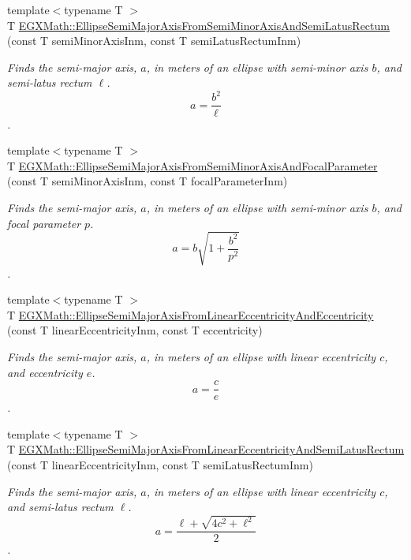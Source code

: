\begin{DoxyCompactItemize}
{\footnotesize template$<$typename T $>$ }\\T \mbox{\hyperlink{group___e_g_x_math-_geometry-2_d-_ellipse-_semi_major_axis_ga1352fb9ee77a05d6b5d733c0fa048479}{E\+G\+X\+Math\+::\+Ellipse\+Semi\+Major\+Axis\+From\+Semi\+Minor\+Axis\+And\+Semi\+Latus\+Rectum}} (const T semi\+Minor\+Axis\+Inm, const T semi\+Latus\+Rectum\+Inm)
\begin{DoxyCompactList}\small\item\em Finds the semi-\/major axis, $a$, in meters of an ellipse with semi-\/minor axis $b$, and semi-\/latus rectum $\ell$. \[ a= \frac{b^2}{\ell} \]. \end{DoxyCompactList}\item 
{\footnotesize template$<$typename T $>$ }\\T \mbox{\hyperlink{group___e_g_x_math-_geometry-2_d-_ellipse-_semi_major_axis_ga8d8abd93ee6cdf43ba490874218f925f}{E\+G\+X\+Math\+::\+Ellipse\+Semi\+Major\+Axis\+From\+Semi\+Minor\+Axis\+And\+Focal\+Parameter}} (const T semi\+Minor\+Axis\+Inm, const T focal\+Parameter\+Inm)
\begin{DoxyCompactList}\small\item\em Finds the semi-\/major axis, $a$, in meters of an ellipse with semi-\/minor axis $b$, and focal parameter $p$. \[ a=b\sqrt{1+\dfrac{b^2}{p^2}} \]. \end{DoxyCompactList}\item 
{\footnotesize template$<$typename T $>$ }\\T \mbox{\hyperlink{group___e_g_x_math-_geometry-2_d-_ellipse-_semi_major_axis_gaf013b5a5e305696948669e348c7dd1c1}{E\+G\+X\+Math\+::\+Ellipse\+Semi\+Major\+Axis\+From\+Linear\+Eccentricity\+And\+Eccentricity}} (const T linear\+Eccentricity\+Inm, const T eccentricity)
\begin{DoxyCompactList}\small\item\em Finds the semi-\/major axis, $a$, in meters of an ellipse with linear eccentricity $c$, and eccentricity $e$. \[ a=\dfrac{c}{e} \]. \end{DoxyCompactList}\item 
{\footnotesize template$<$typename T $>$ }\\T \mbox{\hyperlink{group___e_g_x_math-_geometry-2_d-_ellipse-_semi_major_axis_gad5fde13ad96aede92a1c476d373bc295}{E\+G\+X\+Math\+::\+Ellipse\+Semi\+Major\+Axis\+From\+Linear\+Eccentricity\+And\+Semi\+Latus\+Rectum}} (const T linear\+Eccentricity\+Inm, const T semi\+Latus\+Rectum\+Inm)
\begin{DoxyCompactList}\small\item\em Finds the semi-\/major axis, $a$, in meters of an ellipse with linear eccentricity $c$, and semi-\/latus rectum $\ell$. \[ a=\dfrac{\ell+\sqrt{4c^2+\ell^2}}{2} \]. \end{DoxyCompactList}\item 

\end{DoxyCompactItemize}
